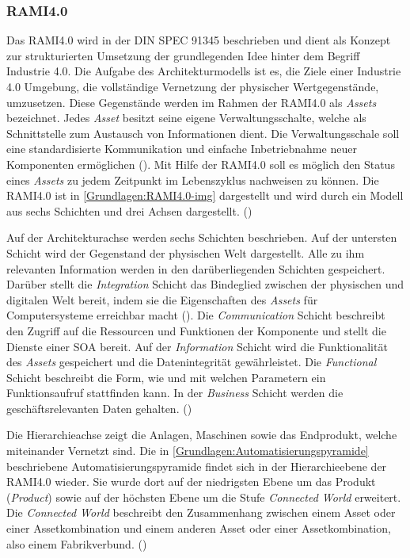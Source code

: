 \subsubsection{\ac{RAMI4.0}}
\label{Grundlagen:RAMI4.0}
Das \ac{RAMI4.0} wird in der DIN SPEC 91345 beschrieben und dient als Konzept zur strukturierten Umsetzung der grundlegenden Idee hinter dem Begriff Industrie 4.0. Die Aufgabe des Architekturmodells ist es, die Ziele einer Industrie 4.0 Umgebung, die vollständige Vernetzung der physischer Wertgegenstände, umzusetzen. Diese Gegenstände werden im Rahmen der \ac{RAMI4.0} als \textit{Assets} bezeichnet. Jedes \textit{Asset} besitzt seine eigene Verwaltungsschalte, welche als Schnittstelle zum Austausch von Informationen dient. Die Verwaltungsschale soll eine standardisierte Kommunikation und einfache Inbetriebnahme neuer Komponenten ermöglichen (\cite{rami2016}). Mit Hilfe der \ac{RAMI4.0} soll es möglich  den Status eines \textit{Assets} zu jedem Zeitpunkt im Lebenszyklus nachweisen zu können. Die \ac{RAMI4.0} ist in \autoref{Grundlagen:RAMI4.0-img} dargestellt und wird durch ein Modell aus sechs Schichten und drei Achsen dargestellt. (\cite{RAMISpec})

Auf der Architekturachse werden sechs Schichten beschrieben. Auf der untersten Schicht wird der Gegenstand der physischen Welt dargestellt. Alle zu ihm relevanten Information werden in den darüberliegenden Schichten gespeichert. Darüber stellt die \textit{Integration} Schicht das Bindeglied zwischen der physischen und digitalen Welt bereit, indem sie die Eigenschaften des \textit{Assets} für Computersysteme erreichbar macht (\cite{BMWiNeCon2016}). Die \textit{Communication} Schicht beschreibt den Zugriff auf die Ressourcen und Funktionen der Komponente und stellt die Dienste einer \ac{SOA} bereit. Auf der \textit{Information} Schicht wird die Funktionalität des \textit{Assets} gespeichert und die Datenintegrität gewährleistet. Die \textit{Functional} Schicht beschreibt die Form, wie und mit welchen Parametern ein Funktionsaufruf stattfinden kann. In der \textit{Business} Schicht werden die geschäftsrelevanten Daten gehalten. (\cite{RAMISpec})

Die Hierarchieachse zeigt die Anlagen, Maschinen sowie das Endprodukt, welche miteinander Vernetzt sind. Die in \autoref{Grundlagen:Automatisierungspyramide} beschriebene Automatisierungspyramide findet sich in der Hierarchieebene der \ac{RAMI4.0} wieder. Sie wurde dort auf der niedrigsten Ebene um das Produkt (\textit{Product}) sowie auf der höchsten Ebene um die Stufe \textit{Connected World} erweitert. Die \textit{Connected World} beschreibt den Zusammenhang zwischen einem Asset oder einer Assetkombination und einem anderen Asset oder einer Assetkombination, also einem Fabrikverbund. (\cite{RAMISpec})

